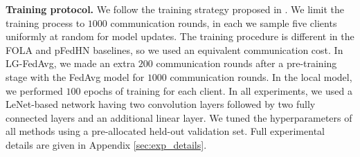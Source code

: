 \documentclass{article}
\begin{document}
\textbf{Training protocol.} We follow the training strategy proposed in \cite{shamsian2021personalized_icml}. 
We limit the training process to $1000$ communication rounds, in each we sample five clients uniformly at random for model updates. The training procedure is different in the FOLA and pFedHN baselines, so we used an equivalent communication cost. In LG-FedAvg, we made an extra $200$ communication rounds after a pre-training stage with the FedAvg model for $1000$ communication rounds. In the local model, we performed $100$ epochs of training for each client. In all experiments, we used a LeNet-based network \cite{lecun1998gradient} having two convolution layers followed by two fully connected layers and an additional linear layer. We tuned the hyperparameters of all methods using a pre-allocated held-out validation set. Full experimental details are given in Appendix \ref{sec:exp_details}.
\end{document}
